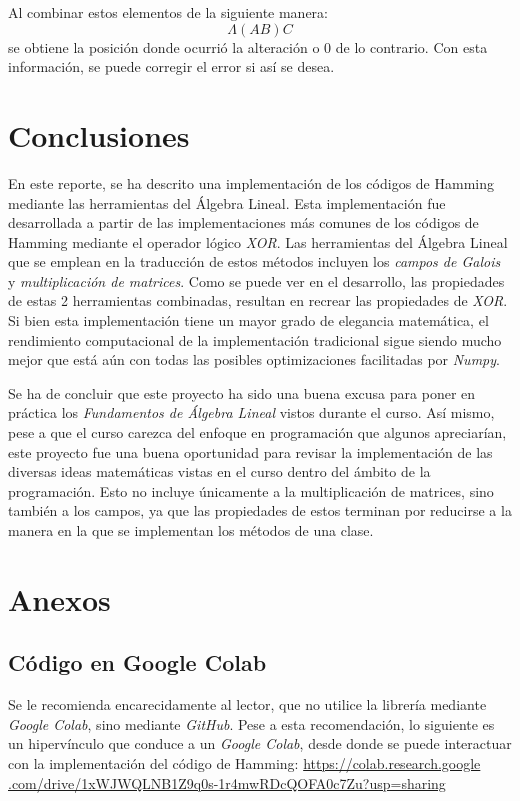 \documentclass{article}
\begin{document}
Al combinar estos elementos de la siguiente manera:
$$
\Lambda(AB)C
$$
se obtiene la posición donde ocurrió la alteración o $0$ de lo contrario. Con esta información, se puede corregir el error si así se desea.

\section{Conclusiones}

En este reporte, se ha descrito una implementación de los códigos de Hamming mediante las herramientas del Álgebra Lineal. Esta implementación fue desarrollada a partir de las implementaciones más comunes de los códigos de Hamming mediante el operador lógico \textit{XOR}. Las herramientas del Álgebra Lineal que se emplean en la traducción de estos métodos incluyen los \textit{campos de Galois} y \textit{multiplicación de matrices}. Como se puede ver en el desarrollo, las propiedades de estas 2 herramientas combinadas, resultan en recrear las propiedades de \textit{XOR}. Si bien esta implementación tiene un mayor grado de elegancia matemática, el rendimiento computacional de la implementación tradicional sigue siendo mucho mejor que está aún con todas las posibles optimizaciones facilitadas por \textit{Numpy}.

Se ha de concluir que este proyecto ha sido una buena excusa para poner en práctica los \textit{Fundamentos de Álgebra Lineal} vistos durante el curso. Así mismo, pese a que el curso carezca del enfoque en programación que algunos apreciarían, este proyecto fue una buena oportunidad para revisar la implementación de las diversas ideas matemáticas vistas en el curso dentro del ámbito de la programación. Esto no incluye únicamente a la multiplicación de matrices, sino también a los campos, ya que las propiedades de estos terminan por reducirse a la manera en la que se implementan los métodos de una clase. 

\section{Anexos}

\subsection{Código en Google Colab}

Se le recomienda encarecidamente al lector, que no utilice la librería mediante \textit{Google Colab}, sino mediante \textit{GitHub}. Pese a esta recomendación, lo siguiente es un hipervínculo que conduce a un \textit{Google Colab}, desde donde se puede interactuar con la implementación del código de Hamming: \href{https://colab.research.google.com/drive/1xWJWQLNB1Z9q0s-1r4mwRDcQOFA0c7Zu?usp=sharing}{https://colab.research.google}\\\href{https://colab.research.google.com/drive/1xWJWQLNB1Z9q0s-1r4mwRDcQOFA0c7Zu?usp=sharing}{.com/drive/1xWJWQLNB1Z9q0s-1r4mwRDcQOFA0c7Zu?usp=sharing}
\end{document}
